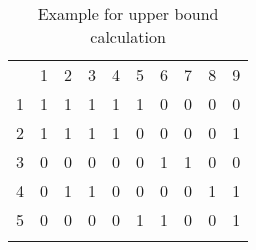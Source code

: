 \documentclass[citeauthoryear]{llncs}
\begin{document}
\begin{table}
\centering
        \begin{tabular}{ c|ccccccccc|}
                  \multicolumn{1}{c}{~} & \multicolumn{1}{c}{1} & \multicolumn{1}{c}{2} & \multicolumn{1}{c}{3} & \multicolumn{1}{c}{4} & \multicolumn{1}{c}{5} & \multicolumn{1}{c}{6} & \multicolumn{1}{c}{7} & \multicolumn{1}{c}{8} & \multicolumn{1}{c}{9} \\
                   \hhline{~---------}
                  1 & \cellcolor{yellow}1  & \cellcolor{yellow}1 &\cellcolor{yellow}1 &\cellcolor{yellow}1 &\multicolumn{1}{c|}{\cellcolor{yellow}1} &\cellcolor{gray}0 &\cellcolor{gray}0 &\cellcolor{blue}\color{white}0 &\cellcolor{blue}\color{white}0\\
                  2 &\cellcolor{yellow}1 &\cellcolor{yellow}1 &\cellcolor{yellow}1 &\cellcolor{yellow}1 &\multicolumn{0}{c|}{\cellcolor{yellow}0} &\cellcolor{gray}0 &\cellcolor{gray}0 &\cellcolor{blue}\color{white}0 &\cellcolor{blue}\color{white}1\\
                   \hhline{~------->{\arrayrulecolor{blue}}-->{\arrayrulecolor{black}}}
                  3 &\cellcolor{gray}0 &\cellcolor{gray}0 &\cellcolor{gray}0 &\cellcolor{gray}0 &\cellcolor{gray}0 &\multicolumn{1}{|c}{\cellcolor{green}1} &\multicolumn{1}{c|}{\cellcolor{green}1} &\cellcolor{blue}\color{white}0 &\cellcolor{blue}\color{white}0\\
                   \hhline{~~~~~~-->{\arrayrulecolor{blue}}-->{\arrayrulecolor{black}}}
                  4 &0 &1 &1 &0 &0 &0 &0 &1 &1\\
                  5 &0 &0 &0 &0 &1 &1 &0 &0 &1\\
                  \hhline{~---------}
        \end{tabular}
        \caption{Example for upper bound calculation}
\label{ex}
\end{table}
\end{document}
